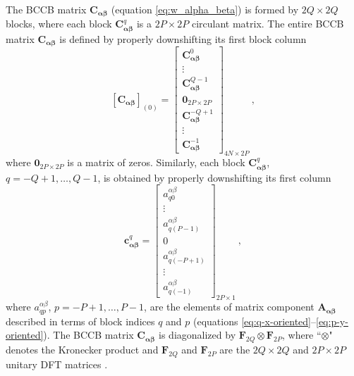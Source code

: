 \documentclass[manuscript]{geophysics}
\begin{document}
The BCCB matrix $\mathbf{C}_{\boldsymbol{\alpha\beta}}$ (equation \ref{eq:w_alpha_beta})
is formed by $2Q \times 2Q$ blocks, 
where each block $\mathbf{C}_{\boldsymbol{\alpha\beta}}^{q}$ is a $2P \times 2P$ circulant matrix.
The entire BCCB matrix $\mathbf{C}_{\boldsymbol{\alpha\beta}}$ is defined by properly
downshifting its first block column
\begin{equation}
	\left[ \mathbf{C}_{\boldsymbol{\alpha\beta}} \right]_{(0)} = \begin{bmatrix}
		\mathbf{C}_{\boldsymbol{\alpha\beta}}^{0} \\
		\vdots \\
		\mathbf{C}_{\boldsymbol{\alpha\beta}}^{Q-1} \\
		\mathbf{0}_{2P \times 2P} \\
		\mathbf{C}_{\boldsymbol{\alpha\beta}}^{-Q+1} \\
		\vdots \\
		\mathbf{C}_{\boldsymbol{\alpha\beta}}^{-1}
	\end{bmatrix}_{4N \times 2P} \: ,
	\label{eq:C_alpha_beta_first_block_column}
\end{equation}
where $\mathbf{0}_{2P \times 2P}$ is a matrix of zeros. Similarly, 
each block $\mathbf{C}_{\boldsymbol{\alpha\beta}}^{q}$, $q = -Q+1, \dots, Q-1$,
is obtained by properly downshifting its first column
\begin{equation}
	\mathbf{c}_{\boldsymbol{\alpha\beta}}^{q} = \begin{bmatrix}
		a^{\alpha\beta}_{q0} \\
		\vdots \\
		a^{\alpha\beta}_{q(P-1)} \\
		0 \\
		a^{\alpha\beta}_{q(-P+1)} \\
		\vdots \\
		a^{\alpha\beta}_{q(-1)}
	\end{bmatrix}_{2P \times 1} \: ,
	\label{eq:cq_alpha_beta}
\end{equation}
where $a^{\alpha\beta}_{qp}$, $p = -P+1, \dots, P-1$, are the elements of
matrix component $\mathbf{A_{\boldsymbol{\alpha\beta}}}$ described in terms of
block indices $q$ and $p$ (equations \ref{eq:q-x-oriented}--\ref{eq:p-y-oriented}). 
The BCCB matrix $\mathbf{C}_{\boldsymbol{\alpha\beta}}$ is diagonalized by
$\mathbf{F}_{2Q} \otimes \mathbf{F}_{2P}$, where ``$\otimes$" denotes the Kronecker product
\citep[e.g.,][ p. 242]{horn_johnson1991} and $\mathbf{F}_{2Q}$ and $\mathbf{F}_{2P}$ are 
the $2Q \times 2Q$ and $2P \times 2P$ unitary DFT matrices \citep[][ p. 31]{davis1979}.
\end{document}
